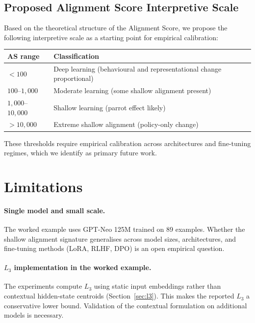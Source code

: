 \documentclass[11pt,a4paper]{article}
\begin{document}
\subsection{Proposed Alignment Score Interpretive Scale}

Based on the theoretical structure of the Alignment Score, we propose the following
interpretive scale as a starting point for empirical calibration:

\begin{center}
\renewcommand{\arraystretch}{1.3}
\begin{tabular}{ll}
\toprule
\textbf{AS range} & \textbf{Classification} \\
\midrule
$< 100$           & Deep learning (behavioural and representational change proportional) \\
$100$--$1{,}000$  & Moderate learning (some shallow alignment present) \\
$1{,}000$--$10{,}000$ & Shallow learning (parrot effect likely) \\
$> 10{,}000$      & Extreme shallow alignment (policy-only change) \\
\bottomrule
\end{tabular}
\end{center}

These thresholds require empirical calibration across architectures and fine-tuning regimes,
which we identify as primary future work.

\section{Limitations}

\paragraph{Single model and small scale.}
The worked example uses GPT-Neo 125M trained on 89 examples. Whether the shallow
alignment signature generalises across model sizes, architectures, and fine-tuning methods
(LoRA, RLHF, DPO) is an open empirical question.

\paragraph{$L_3$ implementation in the worked example.}
The experiments compute $L_3$ using static input embeddings rather than contextual
hidden-state centroids (Section~\ref{sec:l3}). This makes the reported $L_3$ a conservative
lower bound. Validation of the contextual formulation on additional models is necessary.
\end{document}
